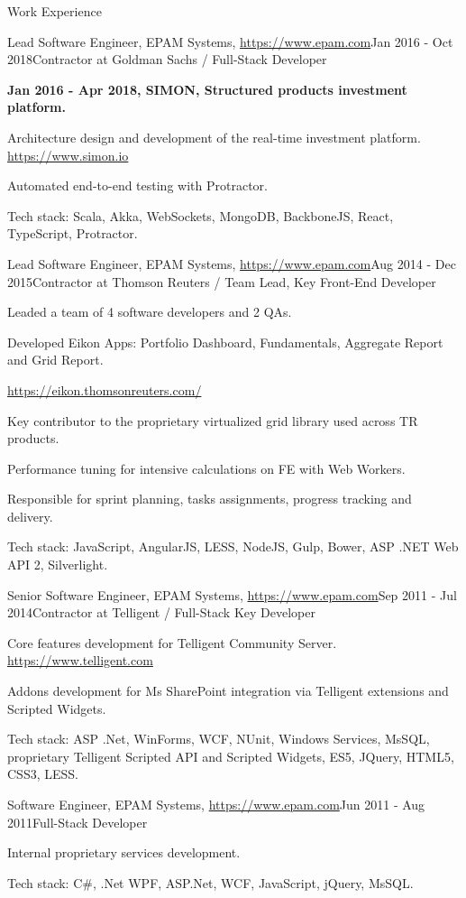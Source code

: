 \documentclass{resume}
\begin{document}
\begin{rSection}{Work Experience}
\begin{rSubsection}{Lead Software Engineer, EPAM Systems, \url{https://www.epam.com}}{Jan 2016 - Oct 2018}{Contractor at Goldman Sachs / Full-Stack Developer}{}
\item[] \textbf{Jan 2016 - Apr 2018, SIMON, Structured products investment platform.}
\item Architecture design and development of the real-time investment platform. \url{https://www.simon.io}
\item Automated end-to-end testing with Protractor.

Tech stack: Scala, Akka, WebSockets, MongoDB, BackboneJS, React, TypeScript, Protractor.
\end{rSubsection}


\begin{rSubsection}{Lead Software Engineer, EPAM Systems, \url{https://www.epam.com}}{Aug 2014 - Dec 2015}{Contractor at Thomson Reuters / Team Lead, Key Front-End Developer}{}
\item Leaded a team of 4 software developers and 2 QAs.
\item Developed Eikon Apps: Portfolio Dashboard, Fundamentals, Aggregate Report and Grid Report.
\item[] \url{https://eikon.thomsonreuters.com/}
\item Key contributor to the proprietary virtualized grid library used across TR products.
\item Performance tuning for intensive calculations on FE with Web Workers.
\item Responsible for sprint planning, tasks assignments, progress tracking and delivery.

Tech stack: JavaScript, AngularJS, LESS, NodeJS, Gulp, Bower, ASP .NET Web API 2, Silverlight.
\end{rSubsection}

\begin{rSubsection}{Senior Software Engineer, EPAM Systems, \url{https://www.epam.com}}{Sep 2011 - Jul 2014}{Contractor at Telligent / Full-Stack Key Developer}{}
\item Core features development for Telligent Community Server. \url{https://www.telligent.com}
\item Addons development for Ms SharePoint integration via Telligent extensions and Scripted Widgets.

Tech stack:  ASP .Net, WinForms, WCF, NUnit, Windows Services, MsSQL, proprietary Telligent Scripted API and Scripted Widgets, ES5, JQuery, HTML5, CSS3, LESS.
\end{rSubsection}


\begin{rSubsection}{Software Engineer, EPAM Systems, \url{https://www.epam.com}}{Jun 2011 - Aug 2011}{Full-Stack Developer}{}
\item Internal proprietary services development.

Tech stack: C\#, .Net WPF, ASP.Net, WCF, JavaScript, jQuery, MsSQL.
\end{rSubsection}

\end{rSection}
\end{document}
